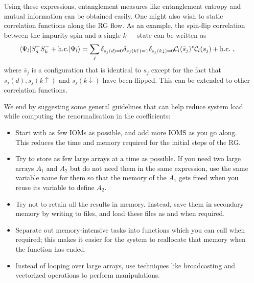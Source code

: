 Using these expressions, entanglement measures like entanglement entropy and mutual information can be obtained easily. One might also wish to static correlation functions along the RG flow. As an example, the spin-flip correlation between the impurity spin and a single \(k-\) state can be written as
\begin{equation}\begin{aligned}
	\braket{\Psi_l | S_d^+S_k^- + \text{h.c.} | \Psi_l} = \sum_j \delta_{s_j(d)=0}\delta_{s_j(k\uparrow)=1}\delta_{s_j(k\downarrow)=0}\mathcal{C}_l(\bar s_j)^*\mathcal{C}_l(s_j) + \text{h.c.}~,
\end{aligned}\end{equation}
where \(\bar s_j\) is a configuration that is identical to \(s_j\) except for the fact that \(s_j(d),s_j(k \uparrow)\) and \(s_j(k \downarrow)\) have been flipped. This can be extended to other correlation functions.

We end by suggesting some general guidelines that can help reduce system load while computing the renormalisation in the coefficients:
\begin{itemize}
	\item Start with as few IOMs as possible, and add more IOMS as you go along. This reduces the time and memory required for the initial steps of the RG.
	\item Try to store as few large arrays at a time as possible. If you need two large arrays \(A_1\) and \(A_2\) but do not need them in the same expression, use the same variable name for them so that the memory of the \(A_1\) gets freed when you reuse its variable to define \(A_2\).
	\item Try not to retain all the results in memory. Instead, save them in secondary memory by writing to files, and load these files as and when required.
	\item Separate out memory-intensive tasks into functions which you can call when required; this makes it easier for the system to reallocate that memory when the function has ended.
	\item Instead of looping over large arrays, use techniques like broadcasting and vectorized operations to perform manipulations.

\end{itemize}




